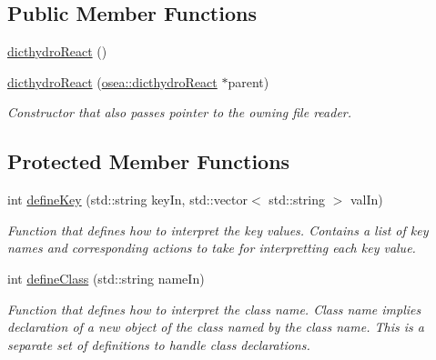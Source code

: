 \subsection*{Public Member Functions}
\begin{DoxyCompactItemize}
\item 
\hyperlink{classosea_1_1dicthydro_react_abb985a75071c4a8f4b100466b124469c}{dicthydro\-React} ()
\item 
\hyperlink{classosea_1_1dicthydro_react_a6767b52a2bd2ed4998bb5441cdc4a2fb}{dicthydro\-React} (\hyperlink{classosea_1_1dicthydro_react}{osea\-::dicthydro\-React} $\ast$parent)
\begin{DoxyCompactList}\small\item\em Constructor that also passes pointer to the owning file reader. \end{DoxyCompactList}\end{DoxyCompactItemize}
\subsection*{Protected Member Functions}
\begin{DoxyCompactItemize}
\item 
int \hyperlink{classosea_1_1dicthydro_react_a68cb7322d30a115ef4e4a2b4048837bb}{define\-Key} (std\-::string key\-In, std\-::vector$<$ std\-::string $>$ val\-In)
\begin{DoxyCompactList}\small\item\em Function that defines how to interpret the key values. Contains a list of key names and corresponding actions to take for interpretting each key value. \end{DoxyCompactList}\item 
int \hyperlink{classosea_1_1dicthydro_react_a3f5b17abba0605ac618e95ce53c5df7e}{define\-Class} (std\-::string name\-In)
\begin{DoxyCompactList}\small\item\em Function that defines how to interpret the class name. Class name implies declaration of a new object of the class named by the class name. This is a separate set of definitions to handle class declarations. \end{DoxyCompactList}\end{DoxyCompactItemize}
